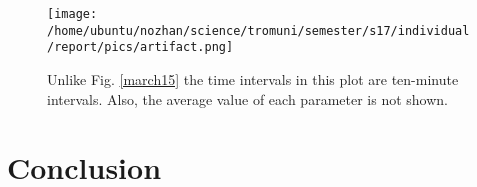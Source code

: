 \documentclass[a4paper,12pt]{article}
\numberwithin{equation}{section} %
\begin{document}




\begin{figure}[bhp]
\texttt{[image: /home/ubuntu/nozhan/science/tromuni/semester/s17/individual/report/pics/artifact.png]}
\caption{Unlike Fig. \ref{march15} the time intervals in this plot are ten-minute intervals. Also, the average value of each parameter is not shown.}
\label{artifact}
\end{figure}

\newpage

\section {Conclusion}
\end{document}
